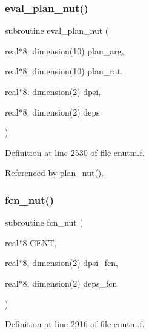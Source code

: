 \subsubsection{\texorpdfstring{eval\+\_\+plan\+\_\+nut()}{eval\_plan\_nut()}}
{\footnotesize\ttfamily subroutine eval\+\_\+plan\+\_\+nut (\begin{DoxyParamCaption}\item[{real$\ast$8, dimension(10)}]{plan\+\_\+arg,  }\item[{real$\ast$8, dimension(10)}]{plan\+\_\+rat,  }\item[{real$\ast$8, dimension(2)}]{dpsi,  }\item[{real$\ast$8, dimension(2)}]{deps }\end{DoxyParamCaption})}



Definition at line 2530 of file cnutm.\+f.



Referenced by plan\+\_\+nut().

\mbox{\label{cnutm_8f_ab1a366d14b0c9f128a2d73fee2bc2426}} 
\subsubsection{\texorpdfstring{fcn\+\_\+nut()}{fcn\_nut()}}
{\footnotesize\ttfamily subroutine fcn\+\_\+nut (\begin{DoxyParamCaption}\item[{real$\ast$8}]{C\+E\+NT,  }\item[{real$\ast$8, dimension(2)}]{dpsi\+\_\+fcn,  }\item[{real$\ast$8, dimension(2)}]{deps\+\_\+fcn }\end{DoxyParamCaption})}



Definition at line 2916 of file cnutm.\+f.

\mbox{\label{cnutm_8f_ad343cebc6d52dc7daa6aa5357606a022}} 
